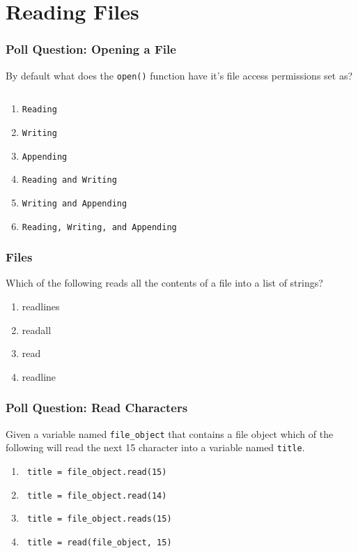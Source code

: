 \documentclass{beamer}
\begin{document}
\section{Reading Files}
\begin{frame}[fragile]
  \frametitle{Poll Question: Opening a File}
  By default what does the \lstinline|open()| function have it's file access permissions set as?
  \begin{lstlisting}[language=Python, autogobble]
  \end{lstlisting}
  \vfill
  \begin{enumerate}[A]
    \item \lstinline|Reading|
    \item \lstinline|Writing|
    \item \lstinline|Appending|
    \item \lstinline|Reading and Writing|
    \item \lstinline|Writing and Appending|
    \item \lstinline|Reading, Writing, and Appending|
  \end{enumerate}
\end{frame}

%
%
\begin{frame}[fragile]
  \frametitle{Files}
  Which of the following reads all the contents of a file into a list of strings?
  \vfill
  \begin{enumerate}[A]
    \item readlines
    \item readall
    \item read
    \item readline
  \end{enumerate}
\end{frame}


%
%
\begin{frame}[fragile]
  \frametitle{Poll Question: Read Characters}
  Given a variable named \lstinline|file_object| that contains a file object which of the following will read the next 15 character into a variable named \lstinline|title|.
  \vfill
  \begin{enumerate}[A]
    \item \lstinline| title = file_object.read(15)|
    \item \lstinline| title = file_object.read(14)|
    \item \lstinline| title = file_object.reads(15)|
    \item \lstinline| title = read(file_object, 15)|
  \end{enumerate}
\end{frame}
\end{document}
